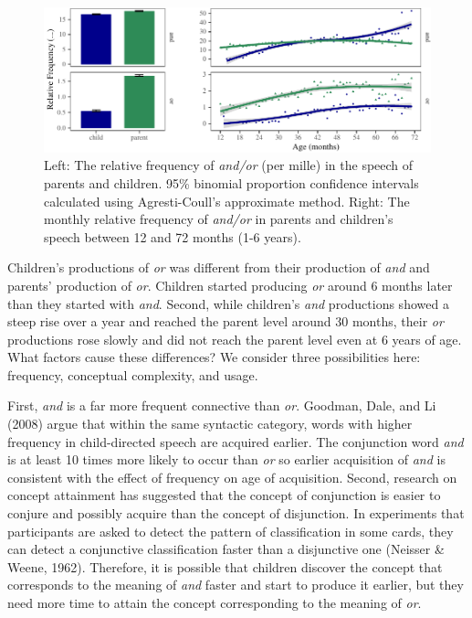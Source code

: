 \documentclass[,man,floatsintext]{apa6}
\begin{document}
\begin{figure}[tb]

{\centering \includegraphics{figs/freqPlots-1} 

}

\caption{Left: The relative frequency of \textit{and/or} (per mille) in the speech of parents and children. 95\% binomial proportion confidence intervals calculated using Agresti-Coull's approximate method. Right: The monthly relative frequency of \textit{and/or} in parents and children's speech between 12 and 72 months (1-6 years).}\label{fig:freqPlots}
\end{figure}

Children's productions of \emph{or} was different from their production of \emph{and} and parents' production of \emph{or}. Children started producing \emph{or} around 6 months later than they started with \emph{and}. Second, while children's \emph{and} productions showed a steep rise over a year and reached the parent level around 30 months, their \emph{or} productions rose slowly and did not reach the parent level even at 6 years of age. What factors cause these differences? We consider three possibilities here: frequency, conceptual complexity, and usage.

First, \emph{and} is a far more frequent connective than \emph{or}. Goodman, Dale, and Li (2008) argue that within the same syntactic category, words with higher frequency in child-directed speech are acquired earlier. The conjunction word \emph{and} is at least 10 times more likely to occur than \emph{or} so earlier acquisition of \emph{and} is consistent with the effect of frequency on age of acquisition. Second, research on concept attainment has suggested that the concept of conjunction is easier to conjure and possibly acquire than the concept of disjunction. In experiments that participants are asked to detect the pattern of classification in some cards, they can detect a conjunctive classification faster than a disjunctive one (Neisser \& Weene, 1962). Therefore, it is possible that children discover the concept that corresponds to the meaning of \emph{and} faster and start to produce it earlier, but they need more time to attain the concept corresponding to the meaning of \emph{or}.
\end{document}
